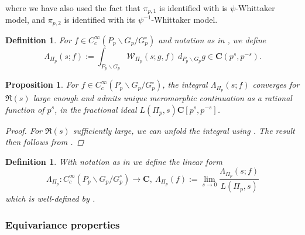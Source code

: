 \documentclass{amsart}%
\theoremstyle{plain}
\newtheorem{prop}[thm]{Proposition}
\theoremstyle{plain}
\newtheorem{defn}[thm]{Definition}
\theoremstyle{remark}
\begin{document}
where we have also used the fact that $\pi_{p,1}$ is identified with is $\psi$-Whittaker model, and $\pi_{p,2}$ is identified with its $\psi^{-1}$-Whittaker model.
\begin{defn}
    For $f\in C_c^\infty(P_p\backslash G_p/G_p^\circ)$ and notation as in \emph{}, we define
    $$\Lambda_{\Pi_p}(s;f):=\int_{P_p\backslash G_p} \mathscr{W}_{\Pi_p}(s;g,f)\ d_{P_p\backslash G_p} g\in \mathbf{C}(p^s,p^{-s}).$$
\end{defn}
\begin{prop}\label{prop meromorphic cont}
    For $f\in C_c^\infty(P_p\backslash G_p/G_p^\circ)$, the integral $\Lambda_{\Pi_p}(s;f)$ converges for $\Re(s)$ large enough and admits unique meromorphic continuation as a rational function of $p^s$, in the fractional ideal $L(\Pi_p,s)\mathbf{C}[p^s,p^{-s}]$. 
    \begin{proof}
        For $\Re(s)$ sufficiently large, we can unfold the integral using . The result then follows from \cite{jacquet1983rankin}.
    \end{proof}
\end{prop}
\begin{defn} With notation as in \emph{} we define the linear form 
$$\Lambda_{\Pi_p}:C_c^\infty(P_p\backslash G_p/G_p^\circ)\longrightarrow \mathbf{C},\ \Lambda_{\Pi_p}(f):= \lim_{s\rightarrow 0}\frac{\Lambda_{\Pi_p}(s;f)}{L(\Pi_p,s)}$$
which is well-defined by \emph{}.
\end{defn}
\subsubsection{Equivariance properties}
\end{document}
